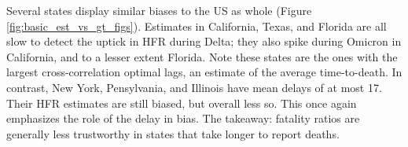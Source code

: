 \documentclass{article}
\begin{document}
Several states display similar biases to the US as whole (Figure
\ref{fig:basic_est_vs_gt_figs}). Estimates in California, Texas, and Florida are 
all slow to detect the uptick in HFR during Delta; they also spike during
Omicron in California, and to a lesser extent Florida. Note these states are the
ones with the largest cross-correlation optimal lags, an estimate of the average 
time-to-death. In contrast, New York, Pensylvania, and Illinois have mean delays
of at most 17. Their HFR estimates are still biased, but overall less so. This
once again emphasizes the role of the delay in bias. The takeaway: fatality
ratios are generally less trustworthy in states that take longer to report
deaths.         



\end{document}
